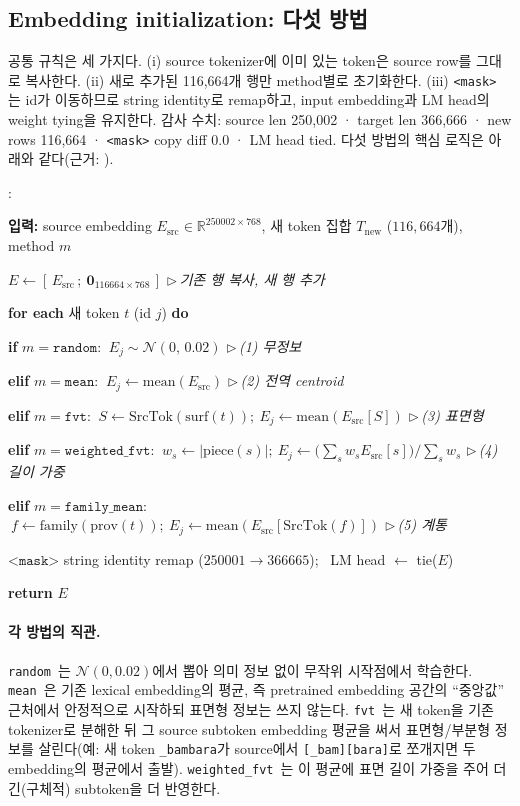\documentclass[11pt,a4paper]{article}
\newcounter{pcln}
\newenvironment{pcode}{%
  \begin{list}{\scriptsize\arabic{pcln}:}{%
    \usecounter{pcln}\small
    \setlength{\leftmargin}{2.2em}\setlength{\labelwidth}{1.6em}%
    \setlength{\itemsep}{1.5pt}\setlength{\parsep}{0pt}\setlength{\topsep}{3pt}}%
}{\end{list}}
\newcommand{\kw}[1]{\textbf{#1}}                       %
\newcommand{\ind}{\hspace*{1.3em}}                     %
\newcommand{\cmt}[1]{\hfill{\footnotesize$\triangleright$\,\textit{#1}}}  %
\newcommand{\rand}{\texttt{random}}
\newcommand{\meanm}{\texttt{mean}}
\newcommand{\fvt}{\texttt{fvt}}
\newcommand{\wfvt}{\texttt{weighted\_fvt}}
\begin{document}
\subsection{Embedding initialization: 다섯 방법}
공통 규칙은 세 가지다. (i) source tokenizer에 이미 있는 token은 source row를 그대로 복사한다. (ii) 새로 추가된 116{,}664개 행만 method별로 초기화한다. (iii) \verb|<mask>| 는 id가 이동하므로 string identity로 remap하고, input embedding과 LM head의 weight tying을 유지한다. 감사 수치: source len 250{,}002 · target len 366{,}666 · new rows 116{,}664 · \verb|<mask>| copy diff 0.0 · LM head tied. 다섯 방법의 핵심 로직은 아래와 같다(근거: ).

\begin{algorithm}[h]
\caption{새 vocabulary 행 초기화 (5-way)}
\begin{pcode}
\item \kw{입력:} source embedding $E_{\text{src}}\in\mathbb{R}^{250002\times768}$, 새 token 집합 $T_{\text{new}}$ ($116{,}664$개), method $m$
\item $E \gets [\,E_{\text{src}}\,;\ \mathbf{0}_{116664\times768}\,]$ \cmt{기존 행 복사, 새 행 추가}
\item \kw{for each} 새 token $t$ (id $j$) \kw{do}
\item \ind \kw{if} $m{=}\texttt{random}$: $\ E_j \sim \mathcal{N}(0,\,0.02)$ \cmt{(1) 무정보}
\item \ind \kw{elif} $m{=}\texttt{mean}$: $\ E_j \gets \mathrm{mean}(E_{\text{src}})$ \cmt{(2) 전역 centroid}
\item \ind \kw{elif} $m{=}\texttt{fvt}$: $\ S \gets \mathrm{SrcTok}(\mathrm{surf}(t));\ E_j \gets \mathrm{mean}(E_{\text{src}}[S])$ \cmt{(3) 표면형}
\item \ind \kw{elif} $m{=}\texttt{weighted\_fvt}$: $\ w_s \gets |\mathrm{piece}(s)|;\ E_j \gets \big(\textstyle\sum_{s} w_s E_{\text{src}}[s]\big)/\textstyle\sum_{s} w_s$ \cmt{(4) 길이 가중}
\item \ind \kw{elif} $m{=}\texttt{family\_mean}$: $\ f \gets \mathrm{family}(\mathrm{prov}(t));\ E_j \gets \mathrm{mean}(E_{\text{src}}[\mathrm{SrcTok}(f)])$ \cmt{(5) 계통}
\item $\texttt{<mask>}$ string identity remap ($250001{\to}366665$); \ LM head $\gets$ tie($E$)
\item \kw{return} $E$
\end{pcode}
\end{algorithm}

\paragraph{각 방법의 직관.}
\rand\ 는 $\mathcal{N}(0,0.02)$에서 뽑아 의미 정보 없이 무작위 시작점에서 학습한다. \meanm\ 은 기존 lexical embedding의 평균, 즉 pretrained embedding 공간의 ``중앙값'' 근처에서 안정적으로 시작하되 표면형 정보는 쓰지 않는다. \fvt\ 는 새 token을 기존 tokenizer로 분해한 뒤 그 source subtoken embedding 평균을 써서 표면형/부분형 정보를 살린다(예: 새 token \texttt{\_bambara}가 source에서 \texttt{[\_bam][bara]}로 쪼개지면 두 embedding의 평균에서 출발). \wfvt\ 는 이 평균에 표면 길이 가중을 주어 더 긴(구체적) subtoken을 더 반영한다.
\end{document}
